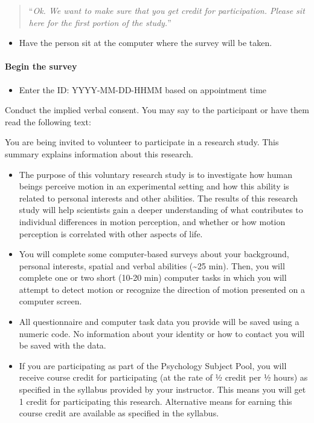 \documentclass[]{article}
\providecommand{\tightlist}{%
  \setlength{\itemsep}{0pt}\setlength{\parskip}{0pt}}
\let\oldparagraph\paragraph
\renewcommand{\paragraph}[1]{\oldparagraph{#1}\mbox{}}
\begin{document}
\begin{quote}
``\emph{Ok. We want to make sure that you get credit for participation.
Please sit here for the first portion of the study.}''
\end{quote}

\begin{itemize}
\tightlist
\item
  Have the person sit at the computer where the survey will be taken.
\end{itemize}

\hypertarget{begin-the-survey}{%
\paragraph{Begin the survey}\label{begin-the-survey}}

\begin{itemize}
\tightlist
\item
  Enter the ID: YYYY-MM-DD-HHMM based on appointment time
\end{itemize}

Conduct the implied verbal consent. You may say to the participant or
have them read the following text:

You are being invited to volunteer to participate in a research study.
This summary explains information about this research.

\begin{itemize}
\tightlist
\item
  The purpose of this voluntary research study is to investigate how
  human beings perceive motion in an experimental setting and how this
  ability is related to personal interests and other abilities. The
  results of this research study will help scientists gain a deeper
  understanding of what contributes to individual differences in motion
  perception, and whether or how motion perception is correlated with
  other aspects of life.
\item
  You will complete some computer-based surveys about your background,
  personal interests, spatial and verbal abilities (\textasciitilde{}25
  min). Then, you will complete one or two short (10-20 min) computer
  tasks in which you will attempt to detect motion or recognize the
  direction of motion presented on a computer screen.
\item
  All questionnaire and computer task data you provide will be saved
  using a numeric code. No information about your identity or how to
  contact you will be saved with the data.
\item
  If you are participating as part of the Psychology Subject Pool, you
  will receive course credit for participating (at the rate of ½ credit
  per ½ hours) as specified in the syllabus provided by your instructor.
  This means you will get 1 credit for participating this research.
  Alternative means for earning this course credit are available as
  specified in the syllabus.
\end{itemize}
\end{document}
